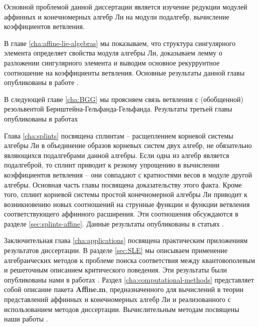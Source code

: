 Основной проблемой данной диссертации является изучение редукции модулей аффинных и конечномерных алгебр Ли на модули подалгебр, вычисление коэффициентов ветвления. 

В главе \ref{cha:affine-lie-algebras} мы показываем, что структура сингулярного элемента определяет свойства модуля алгебры Ли, доказываем лемму о разложении сингулярного элемента и выводим основное рекуррунтное соотношение на коэффициенты ветвления. Основные результаты данной главы опубликованы в работе . 

В следующей главе \ref{cha:BGG} мы проясняем связь ветвления с (обобщенной) резольвентой Бернштейна-Гельфанда-Гельфанда. Результаты третьей главы опубликованы в работах 

Глава \ref{cha:splints} посвящена сплинтам -- расщеплением корневой системы алгебры Ли в объединение образов корневых систем двух алгебр, не обязательно являющихся подалгебрами данной алгебры. Если одна из алгебр является подалгеброй, то сплинт приводит к резкому упрощению в вычислении коэффициентов ветвления -- они совпадают с кратностями весов в модуле другой алгебры. Основная часть главы посвящена доказательству этого факта. Кроме того, сплинт корневой системы простой конечномерной алгебры Ли приводит к возникновению новых соотношений на струнные функции и функции ветвления соответствующего аффинного расширения. Эти соотношения обсуждаются в разделе \ref{sec:splints-affine}. Данные результаты опубликованы в статьях .

Заключительная глава \ref{cha:applications} посвящена практическим приложениям результатов диссертации. В разделе \ref{sec:SLE} мы  описываем применение алгебраических методов к проблеме поиска соответствия между квантовополевым и решеточным описанием критического поведения. Эти результаты были опубликованы нами в работах . Раздел \ref{cha:computational-methods} представляет собой описание пакета {\bf Affine.m}, предназначенного для вычислений в теории представлений аффинных и конечномерных алгебр Ли и реализованного с использованием методов диссертации. Вычислительным методам посвящены наши работы .

